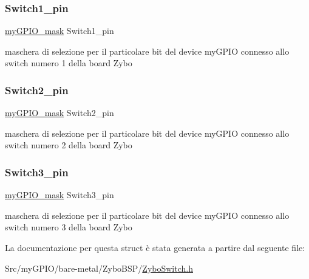 \subsubsection{\texorpdfstring{Switch1\+\_\+pin}{Switch1\_pin}}
{\footnotesize\ttfamily \hyperlink{group__bare-metal_ga402a0d20afc0cb7c25554b8b023f4253}{my\+G\+P\+I\+O\+\_\+mask} Switch1\+\_\+pin}

maschera di selezione per il particolare bit del device my\+G\+P\+IO connesso allo switch numero 1 della board Zybo \mbox{\label{struct_zybo_switch__t_aacdefa991c974546015032b1bb95ea1e}} 
\subsubsection{\texorpdfstring{Switch2\+\_\+pin}{Switch2\_pin}}
{\footnotesize\ttfamily \hyperlink{group__bare-metal_ga402a0d20afc0cb7c25554b8b023f4253}{my\+G\+P\+I\+O\+\_\+mask} Switch2\+\_\+pin}

maschera di selezione per il particolare bit del device my\+G\+P\+IO connesso allo switch numero 2 della board Zybo \mbox{\label{struct_zybo_switch__t_ab2ea73dda75022931396b29e1c377cfb}} 
\subsubsection{\texorpdfstring{Switch3\+\_\+pin}{Switch3\_pin}}
{\footnotesize\ttfamily \hyperlink{group__bare-metal_ga402a0d20afc0cb7c25554b8b023f4253}{my\+G\+P\+I\+O\+\_\+mask} Switch3\+\_\+pin}

maschera di selezione per il particolare bit del device my\+G\+P\+IO connesso allo switch numero 3 della board Zybo 

La documentazione per questa struct è stata generata a partire dal seguente file\+:\begin{DoxyCompactItemize}
\item 
Src/my\+G\+P\+I\+O/bare-\/metal/\+Zybo\+B\+S\+P/\hyperlink{_zybo_switch_8h}{Zybo\+Switch.\+h}\end{DoxyCompactItemize}
